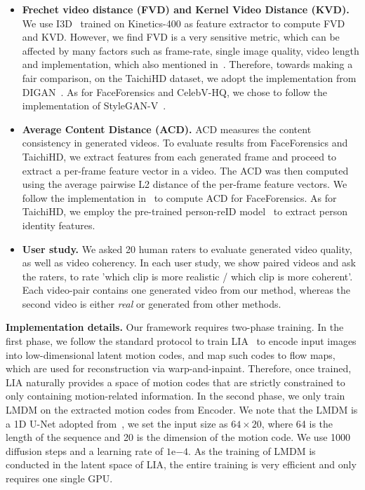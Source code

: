 {\begin{itemize}
\item \textbf{Frechet video distance (FVD) and Kernel Video Distance (KVD).} We use I3D~\citep{carreira2017quo} trained on Kinetics-400 as feature extractor to compute FVD and KVD. However, we find FVD is a very sensitive metric, which can be affected by many factors such as frame-rate, single image quality, video length and implementation, which also mentioned in~\citep{stylegan-v}. Therefore, towards making a fair comparison, on the TaichiHD dataset, we adopt the implementation from DIGAN~\citep{digan}. As for FaceForensics and CelebV-HQ, we chose to follow the implementation of StyleGAN-V~\citep{stylegan-v}. 
\item \textbf{Average Content Distance (ACD).} ACD measures the content consistency in generated videos. To evaluate results from FaceForensics and TaichiHD, we extract features from each generated frame and proceed to extract a per-frame feature vector in a video. The ACD was then computed using the average pairwise L2 distance of the per-frame feature vectors. We follow the implementation in~\citep{mocoganhd} to compute ACD for FaceForensics. As for TaichiHD, we employ the pre-trained person-reID model~\citep{zheng2018discriminatively} to extract person identity features.
\item \textbf{User study.} We asked 20 human raters to evaluate generated video quality, as well as video coherency. In each user study, we show paired videos and ask the raters, to rate 'which clip is more realistic / which clip is more coherent'. Each video-pair contains one generated video from our method, whereas the second video is either \textit{real} or generated from other methods.

\end{itemize}

\textbf{Implementation details.} Our framework requires two-phase training. In the first phase, we follow the standard protocol to train LIA~\citep{wang2022latent} to encode input images into low-dimensional latent motion codes, and map such codes to flow maps, which are used for reconstruction via warp-and-inpaint. Therefore, once trained, LIA naturally provides a space of motion codes that are strictly constrained to only containing motion-related information. In the second phase, we only train LMDM on the extracted motion codes from Encoder. We note that the LMDM is a 1D U-Net adopted from~\citep{nichol2021improved}, we set the input size as $64\times 20$, where 64 is the length of the sequence and 20 is the dimension of the motion code. We use 1000 diffusion steps and a learning rate of $1\mathrm{e}{-4}$. As the training of LMDM is conducted in the latent space of LIA, the entire training is very efficient and only requires one single GPU. 

}
